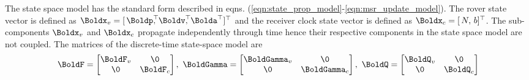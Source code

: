 The state space model has the standard form described in eqns. (\ref{eqn:state_prop_model}-\ref{eqn:msr_update_model}). 
The rover state vector is defined as
$\Boldx_v = [\,\Boldp^\top \!\!\!\!,  \, \Boldv^\top \!\!\!\!, \, \Bolda^\top]^\top$ 
and the receiver clock state vector is defined as $\Boldx_c = [\,N, \, b]^\top$.
The sub-components $\Boldx_v$ and $\Boldx_c$ propagate independently through time hence their respective components in the state space model are not coupled.
The matrices of the discrete-time state-space model are
\begin{align}
	\BoldF = \begin{bmatrix} \BoldF_v & \0 \\ \0 & \BoldF_c \end{bmatrix}, ~
	\BoldGamma = \begin{bmatrix} \BoldGamma_v & \0 \\ \0 & \BoldGamma_c	\end{bmatrix}, ~
	\BoldQ = \begin{bmatrix} \BoldQ_v & \0 \\ \0 & \BoldQ_c \end{bmatrix}
\end{align}

